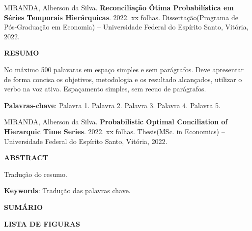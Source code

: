 \documentclass[
  12pt,
  letterpaper,
  DIV=11,
  numbers=noendperiod]{scrartcl}
\newcommand{\nome}{Alberson da Silva}
\newcommand{\sobrenome}{Miranda}
\newcommand{\tipo}{Dissertação}
\newcommand{\tipoingles}{Thesis}
\newcommand{\titulo}{Reconciliação Ótima Probabilística em Séries Temporais Hierárquicas}
\newcommand{\tituloingles}{Probabilistic Optimal Conciliation of Hierarquic Time Series}
\newcommand{\universidade}{Universidade Federal do Espírito Santo}
\newcommand{\curso}{Programa de Pós-Graduação em Economia}
\newcommand{\cursoingles}{MSc. in Economics}
\newcommand{\cidade}{Vitória}
\newcommand{\ano}{2022}
\begin{document}
\newpage
\thispagestyle{empty}
\begin{singlespace}
\noindent \MakeUppercase{\sobrenome}, \nome. \textbf{\titulo}. \ano. xx folhas. \tipo\>(\curso) -- \universidade, \cidade, \ano.

\vspace{1pc}
\begin{center}
\textbf{RESUMO}
\end{center}
\vspace{1pc}

\noindent
No máximo 500 palavaras em espaço simples e sem parágrafos. Deve apresentar de forma concisa os objetivos, metodologia e os resultado alcançados, utilizar o verbo na voz ativa. Espaçamento simples, sem recuo de parágrafos.

\vspace{2pc}
\noindent
{\textbf{Palavras-chave}:}  Palavra 1. Palavra 2. Palavra 3. Palavra 4. Palavra 5.

\end{singlespace}

\newpage
\thispagestyle{empty}

\begin{singlespace}
\noindent \MakeUppercase{\sobrenome}, \nome. \textbf{\tituloingles}. \ano. xx folhas. \tipoingles\>(\cursoingles) -- \universidade, \cidade, \ano.

\vspace{1pc}
\begin{center}
\textbf{ABSTRACT}
\end{center}
\vspace{1pc}

\noindent 
Tradução do resumo.

\vspace{2pc}
\noindent
{\textbf{Keywords}:}  Tradução das palavras chave.
\end{singlespace}

\newpage
\thispagestyle{empty}
\begin{flushleft}
\begingroup
\let\clearpage\relax

\newpage
\begin{center}
\MakeUppercase{\textbf{Sumário}}
\end{center}
\begin{center}
\tableofcontents
\end{center}
\end{flushleft}

\newpage
\thispagestyle{empty}
\begin{center}
\MakeUppercase{\textbf{LISTA DE FIGURAS}}
\end{center}
\begin{center}
\listoffigures
\end{center}
\end{document}
